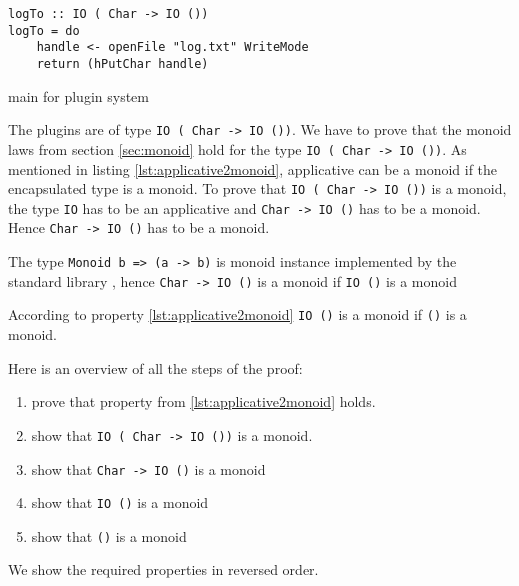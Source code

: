 \begin{program}
\begin{verbatim}
logTo :: IO ( Char -> IO ())
logTo = do
    handle <- openFile "log.txt" WriteMode
    return (hPutChar handle)
\end{verbatim}
\label{lst:logto}
\caption{main for plugin system}
\end{program}

The plugins are of type \verb|IO ( Char -> IO ())|. We have to  prove that the monoid laws from section \ref{sec:monoid} hold for the type \verb|IO ( Char -> IO ())|.
As mentioned in listing \ref{lst:applicative2monoid}, applicative can be a monoid if the encapsulated type is a monoid. To prove that \verb|IO ( Char -> IO ())| is a monoid, the type \verb|IO| has to be an applicative and \verb|Char -> IO ()| has to be a monoid. Hence \verb|Char -> IO ()| has to be a monoid.

The type \verb|Monoid b => (a -> b)| is monoid instance implemented by the standard library \cite{monoid}, hence \verb|Char -> IO ()| is a monoid if \verb|IO ()| is a monoid

According to property \ref{lst:applicative2monoid} \verb|IO ()| is a monoid if \verb|()| is a monoid.

Here is an overview of all the steps of the proof:
\begin{enumerate}
\item prove that property from \ref{lst:applicative2monoid} holds.
\item show that  \verb|IO ( Char -> IO ())| is a monoid.
\item show that \verb|Char -> IO ()| is a monoid
\item show that \verb|IO ()| is a monoid
\item show that \verb|()| is a monoid
\end{enumerate}

We show the required properties in reversed order.

